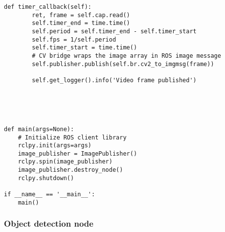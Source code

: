 \begin{lstlisting}[language=PythonPlus, basicstyle=\tiny,]
    def timer_callback(self):
        ret, frame = self.cap.read()
        self.timer_end = time.time()
        self.period = self.timer_end - self.timer_start
        self.fps = 1/self.period
        self.timer_start = time.time()
        # CV bridge wraps the image array in ROS image message
        self.publisher.publish(self.br.cv2_to_imgmsg(frame))

        self.get_logger().info('Video frame published')





def main(args=None):
    # Initialize ROS client library
    rclpy.init(args=args)
    image_publisher = ImagePublisher()
    rclpy.spin(image_publisher)
    image_publisher.destroy_node()
    rclpy.shutdown()

if __name__ == '__main__':
    main()
\end{lstlisting}

\subsubsection{Object detection node}

